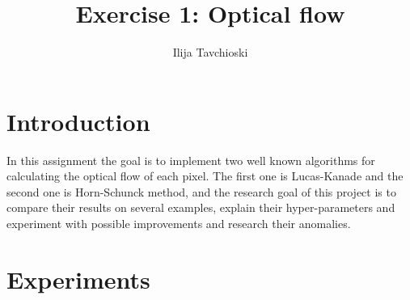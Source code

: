 \documentclass[9pt]{IEEEtran}
\title{\vspace{0ex}
Exercise 1: Optical flow}
\author{Ilija Tavchioski\vspace{-4.0ex}}
\begin{document}
\maketitle

\section{Introduction}
In this assignment the goal is to implement two well known algorithms for calculating the optical flow of each pixel.
The first one is Lucas-Kanade and the second one is Horn-Schunck method, and the research goal of this project is to compare their results on several examples, explain their hyper-parameters and experiment with possible improvements and research their anomalies.

\section{Experiments}
\end{document}
